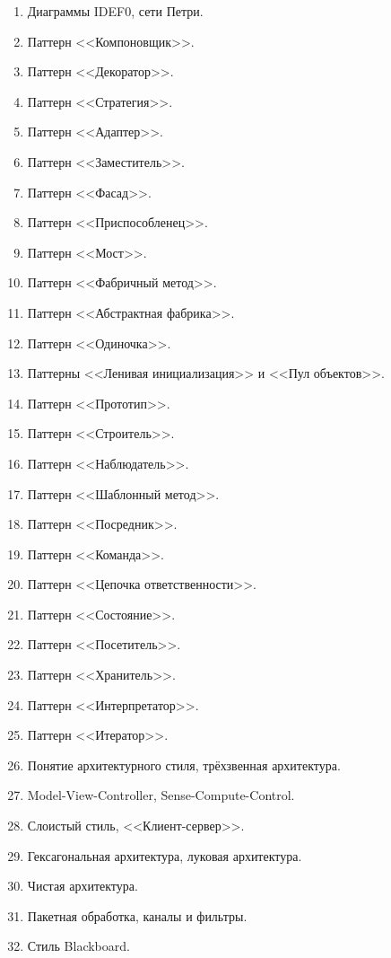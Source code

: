 \documentclass[a5paper]{article}
\begin{document}
\begin{enumerate}
    \item Диаграммы IDEF0, сети Петри. 
    \item Паттерн <<Компоновщик>>.
    \item Паттерн <<Декоратор>>.
    \item Паттерн <<Стратегия>>.
    \item Паттерн <<Адаптер>>.
    \item Паттерн <<Заместитель>>.
    \item Паттерн <<Фасад>>.
    \item Паттерн <<Приспособленец>>.
    \item Паттерн <<Мост>>.
    \item Паттерн <<Фабричный метод>>.
    \item Паттерн <<Абстрактная фабрика>>.
    \item Паттерн <<Одиночка>>.
    \item Паттерны <<Ленивая инициализация>> и <<Пул объектов>>.
    \item Паттерн <<Прототип>>.
    \item Паттерн <<Строитель>>.
    \item Паттерн <<Наблюдатель>>.
    \item Паттерн <<Шаблонный метод>>.
    \item Паттерн <<Посредник>>.
    \item Паттерн <<Команда>>.
    \item Паттерн <<Цепочка ответственности>>.
    \item Паттерн <<Состояние>>.
    \item Паттерн <<Посетитель>>.
    \item Паттерн <<Хранитель>>.
    \item Паттерн <<Интерпретатор>>.
    \item Паттерн <<Итератор>>.
    \item Понятие архитектурного стиля, трёхзвенная архитектура.
    \item Model-View-Controller, Sense-Compute-Control.
    \item Слоистый стиль, <<Клиент-сервер>>.
    \item Гексагональная архитектура, луковая архитектура.
    \item Чистая архитектура.
    \item Пакетная обработка, каналы и фильтры. 
    \item Стиль Blackboard.

\end{enumerate}
\end{document}
